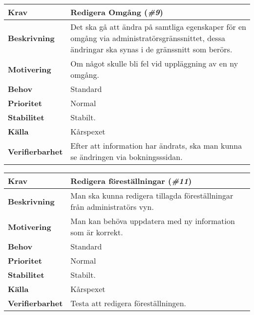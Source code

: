 \documentclass[a4paper, twoside, 11pt, titlepage]{article}
\begin{document}
		\begin{tabular} { p{2.6cm} p{12.5cm} }
			\hline
			\sffamily\textbf{Krav} & Redigera Omgång (\emph{\#9})  \\
			\hline
			\sffamily\textbf{Beskrivning} & Det ska gå att ändra på samtliga egenskaper för en omgång via administratörsgränssnittet, dessa ändringar ska synas i de gränssnitt som berörs.  \\
			\hline
			\sffamily\textbf{Motivering} & Om något skulle bli fel vid uppläggning av en ny omgång.  \\
			\hline
			\sffamily\textbf{Behov} & Standard  \\
			\hline
			\sffamily\textbf{Prioritet} & Normal  \\
			\hline
			\sffamily\textbf{Stabilitet} & Stabilt.  \\
			\hline
			\sffamily\textbf{Källa} & Kårspexet  \\
			\hline
			\sffamily\textbf{Verifierbarhet} & Efter att information har ändrats, ska man kunna se ändringen via bokningsssidan.  \\
			\hline
		\end{tabular}
		\vspace{6mm}

		\begin{tabular} { p{2.6cm} p{12.5cm} }
			\hline
			\sffamily\textbf{Krav} & Redigera föreställningar (\emph{\#11})  \\
			\hline
			\sffamily\textbf{Beskrivning} & Man ska kunna redigera tillagda föreställningar från administratörs vyn.  \\
			\hline
			\sffamily\textbf{Motivering} & Man kan behöva uppdatera med ny information som är korrekt.   \\
			\hline
			\sffamily\textbf{Behov} & Standard  \\
			\hline
			\sffamily\textbf{Prioritet} & Normal  \\
			\hline
			\sffamily\textbf{Stabilitet} & Stabilt.  \\
			\hline
			\sffamily\textbf{Källa} & Kårspexet  \\
			\hline
			\sffamily\textbf{Verifierbarhet} & Testa att redigera föreställningen.  \\
			\hline
		\end{tabular}
		\vspace{6mm}
\end{document}
